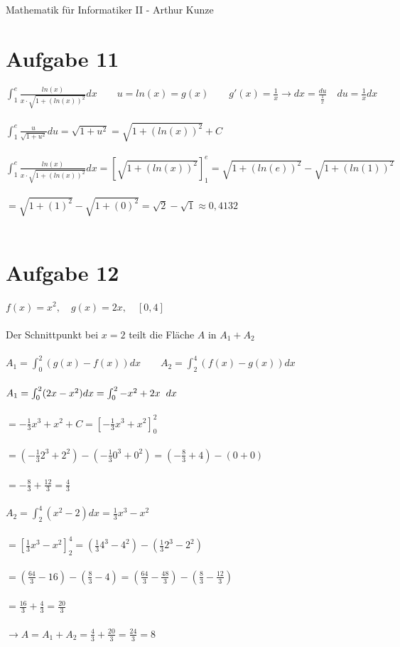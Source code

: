 \documentclass[12pt,a4paper]{article}
\begin{document}
Mathematik für Informatiker II - Arthur Kunze
\section*{Aufgabe 11}
$\int_{1}^{e}\frac{ln(x)}{x\cdot \sqrt{1+(ln(x))^2}}dx \qquad  u=ln(x)=g(x) \qquad g'(x)=\frac{1}{x} \rightarrow dx=\frac{du}{\frac{1}{x}} \quad du=\frac{1}{x}dx$\\
\\
$\int_{1}^{e}\frac{u}{\sqrt{1+u^2}}du = \sqrt{1+u^2} = \sqrt{1+(ln(x))^2}+C$\\
\\
$\int_{1}^{e}\frac{ln(x)}{x\cdot \sqrt{1+(ln(x))^2}}dx = \left[\sqrt{1+(ln(x))^2}\right]_1^e = \sqrt{1+(ln(e))^2}-\sqrt{1+(ln(1))^2}$\\
\\
$=\sqrt{1+(1)^2}-\sqrt{1+(0)^2}=\sqrt{2}-\sqrt{1} \approx 0,4132$\\
\\
\section*{Aufgabe 12}
$f(x)=x^2, \quad g(x)=2x, \quad [0,4]$\\
\\
Der Schnittpunkt bei $x=2$ teilt die Fläche $A$ in $A_1+A_2$\\
\\
$A_1=\int_0^2(g(x)-f(x))dx \qquad A_2=\int_2^4(f(x)-g(x))dx$\\
\\
$A_1=\int_0^2(2x-x^2)dx=\int_0^2-x^2+2x \hspace{0.2cm} dx$\\
\\
$=-\frac{1}{3}x^3+x^2+C = \left[-\frac{1}{3}x^3+x^2\right]_0^2$\\
\\
$=(-\frac{1}{3}2^3+2^2)-(-\frac{1}{3}0^3+0^2)=(-\frac{8}{3}+4)-(0+0)$\\
\\
$=-\frac{8}{3}+\frac{12}{3}=\frac{4}{3}$\\
\\
$A_2=\int_2^4(x^2-2)dx = \frac{1}{3}x^3-x^2$\\
\\
$=\left[\frac{1}{3}x^3-x^2\right]_2^4=(\frac{1}{3}4^3-4^2)-(\frac{1}{3}2^3-2^2)$\\
\\
$=(\frac{64}{3}-16)-(\frac{8}{3}-4)=(\frac{64}{3}-\frac{48}{3})-(\frac{8}{3}-\frac{12}{3})$\\
\\
$=\frac{16}{3}+\frac{4}{3}=\frac{20}{3}$\\
\\
$\rightarrow A=A_1+A_2=\frac{4}{3}+\frac{20}{3}=\frac{24}{3}=8$\\
\\
\end{document}
